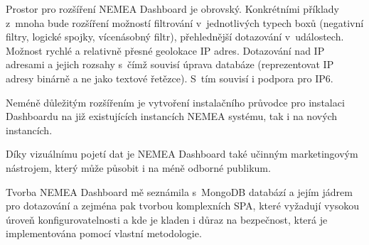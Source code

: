 Prostor pro rozšíření NEMEA Dashboard je obrovský. Konkrétními příklady z~mnoha bude rozšíření možností filtrování v~jednotlivých typech boxů (negativní filtry, logické spojky, vícenásobný filtr), přehlednější dotazování v~událostech. Možnost rychlé a relativně přesné geolokace IP adres. Dotazování nad IP adresami a jejich rozsahy s~čímž souvisí úprava databáze (reprezentovat IP adresy binárně a ne jako textové řetězce). S~tím souvisí i podpora pro IP6.

Neméně důležitým rozšířením je vytvoření instalačního průvodce pro instalaci Dashboardu na již existujících instancích NEMEA systému, tak i na nových instancích.

Díky vizuálnímu pojetí dat je NEMEA Dashboard také učinným marketingovým nástrojem, který může působit i na méně odborné publikum.

Tvorba NEMEA Dashboard mě seznámila s~MongoDB databází a jejím jádrem pro dotazování a zejména pak tvorbou komplexních SPA, které vyžadují vysokou úroveň konfigurovatelnosti a kde je kladen i důraz na bezpečnost, která je implementována pomocí vlastní metodologie.
